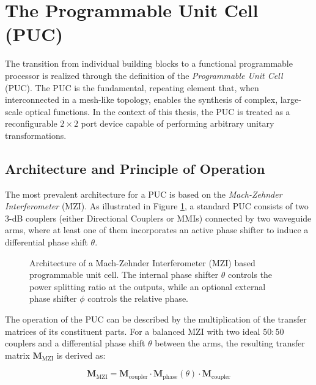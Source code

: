 \section{The Programmable Unit Cell (PUC)}
\label{sec:puc}

The transition from individual building blocks to a functional programmable processor is realized 
through the definition of the \textit{Programmable Unit Cell} (PUC). The PUC is the fundamental, 
repeating element that, when interconnected in a mesh-like topology, enables the synthesis of 
complex, large-scale optical functions. In the context of this thesis, the PUC is treated as a 
reconfigurable $2 \times 2$ port device capable of performing arbitrary unitary transformations.

\subsection{Architecture and Principle of Operation}

The most prevalent architecture for a PUC is based on the \textit{Mach-Zehnder Interferometer} 
(MZI). As illustrated in Figure \ref{fig:puc_mzi_architecture}, a standard PUC consists of two 
$3$-dB couplers (either Directional Couplers or MMIs) connected by two waveguide arms, where at 
least one of them incorporates an active phase shifter to induce a differential phase shift 
$\theta$.

\begin{figure}[htbp]
    \centering
    \caption{Architecture of a Mach-Zehnder Interferometer (MZI) based programmable unit cell. The 
    internal phase shifter $\theta$ controls the power splitting ratio at the outputs, while an 
    optional external phase shifter $\phi$ controls the relative phase.}
    \label{fig:puc_mzi_architecture}
\end{figure}



The operation of the PUC can be described by the multiplication of the transfer matrices of its 
constituent parts. For a balanced MZI with two ideal $50:50$ couplers and a differential phase 
shift $\theta$ between the arms, the resulting transfer matrix $\mathbf{M}_{\text{MZI}}$ is derived 
as:

\begin{equation}
\mathbf{M}_{\text{MZI}} = \mathbf{M}_{\text{coupler}} \cdot \mathbf{M}_{\text{phase}}(\theta) 
\cdot \mathbf{M}_{\text{coupler}}
\label{eq:mzi_matrix_derivation}
\end{equation}

